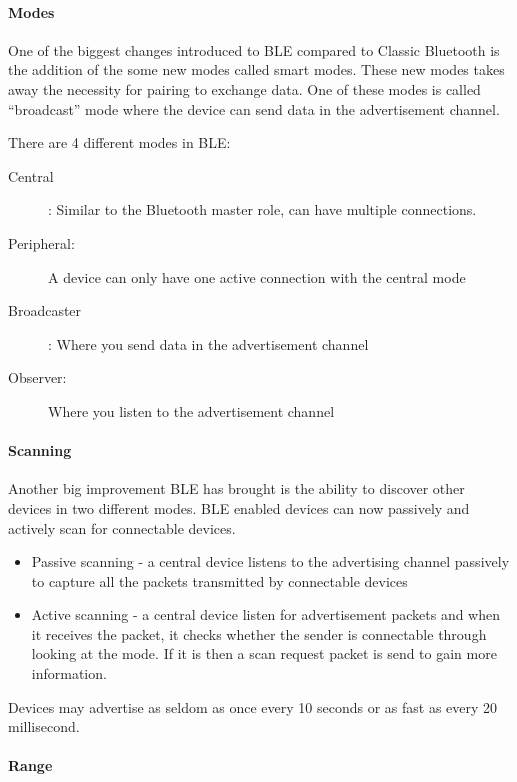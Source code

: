 \paragraph*{Modes\protect \\
}

One of the biggest changes introduced to BLE compared to Classic Bluetooth is the addition of the some new modes called smart modes\cite{bluetooth-chalmers}. These new modes takes
away the necessity for pairing to exchange data. One of these modes is called \textquotedblleft broadcast\textquotedblright{}
mode where the device can send data in the advertisement channel\cite{ble-modes}. 

There are 4 different modes in BLE: 
\begin{description}
\item [{Central}] : Similar to the Bluetooth master role, can have multiple
connections. 
\item [{Peripheral:}] A device can only have one active connection with
the central mode 
\item [{Broadcaster}] : Where you send data in the advertisement channel
\item [{Observer:}] Where you listen to the advertisement channel
\end{description}

\paragraph*{Scanning\protect \linebreak{}
}

Another big improvement BLE has brought is the ability to discover
other devices in two different modes. BLE enabled devices can now
passively and actively scan for connectable devices\cite{bluetooth-chalmers}.
\begin{itemize}
\item Passive scanning - a central device listens to the advertising channel
passively to capture all the packets transmitted by connectable devices 
\item Active scanning - a central device listen for advertisement packets
and when it receives the packet, it checks whether the sender is connectable
through looking at the mode. If it is then a scan request packet is
send to gain more information.
\end{itemize}
Devices may advertise as seldom as once every 10 seconds or as fast
as every 20 millisecond. 


\paragraph*{Range\protect \\
}

